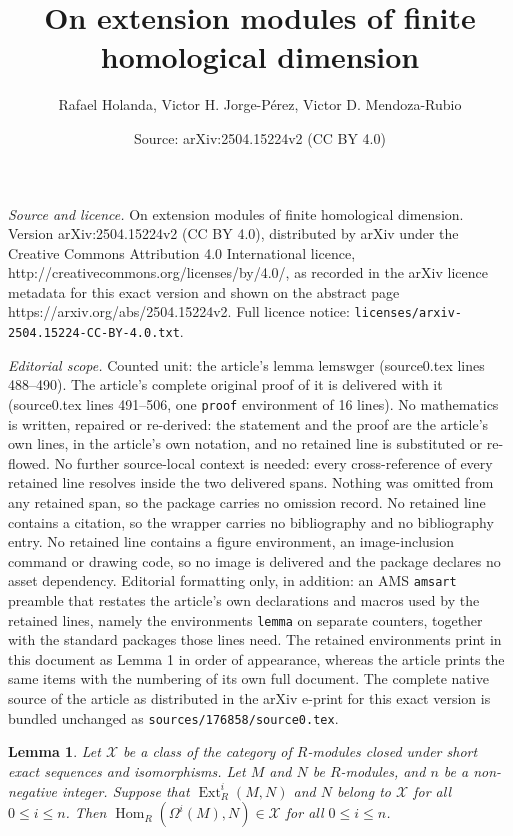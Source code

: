 \documentclass[10pt,a4paper]{amsart}
\title{On extension modules of finite homological dimension}
\author{Rafael Holanda, Victor H. Jorge-P\'erez, Victor D. Mendoza-Rubio}
\date{Source: arXiv:2504.15224v2 (CC BY 4.0)}
\newtheorem{lemma}{Lemma}
\newcommand\Ext{\operatorname{Ext}}
\newcommand\Hom{\operatorname{Hom}}
\begin{document}
\maketitle

\noindent\emph{Source and licence.} On extension modules of finite homological dimension. Version arXiv:2504.15224v2 (CC BY 4.0), distributed by arXiv under the Creative Commons Attribution 4.0 International licence, http://creativecommons.org/licenses/by/4.0/, as recorded in the arXiv licence metadata for this exact version and shown on the abstract page https://arxiv.org/abs/2504.15224v2. Full licence notice: \texttt{licenses/arxiv-2504.15224-CC-BY-4.0.txt}.\par\smallskip

\noindent\textit{Editorial scope.} Counted unit: the article's lemma lemswger (source0.tex lines 488--490). The article's complete original proof of it is delivered with it (source0.tex lines 491--506, one \texttt{proof} environment of 16 lines). No mathematics is written, repaired or re-derived: the statement and the proof are the article's own lines, in the article's own notation, and no retained line is substituted or re-flowed.  No further source-local context is needed: every cross-reference of every retained line resolves inside the two delivered spans.  Nothing was omitted from any retained span, so the package carries no omission record.  No retained line contains a citation, so the wrapper carries no bibliography and no bibliography entry.  No retained line contains a figure environment, an image-inclusion command or drawing code, so no image is delivered and the package declares no asset dependency.  Editorial formatting only, in addition: an AMS \texttt{amsart} preamble that restates the article's own declarations and macros used by the retained lines, namely the environments \texttt{lemma} on separate counters, together with the standard packages those lines need.  The retained environments print in this document as Lemma 1 in order of appearance, whereas the article prints the same items with the numbering of its own full document.  The complete native source of the article as distributed in the arXiv e-print for this exact version is bundled unchanged as \texttt{sources/176858/source0.tex}.
\begin{lemma}\label{lemswger}
Let $\mathcal{X}$ be a class of the category of  $R$-modules closed under short exact sequences and isomorphisms. Let $M$ and $N$ be $R$-modules, and $n$ be a non-negative integer. Suppose that $\Ext_R^i(M,N)$ and $N$ belong to $\mathcal{X}$ for all $0\leq i \leq n$. Then $\Hom_R( \Omega^i(M), N) \in \mathcal{X}$ for all $0\leq i \leq n$. 
\end{lemma}
\end{document}
